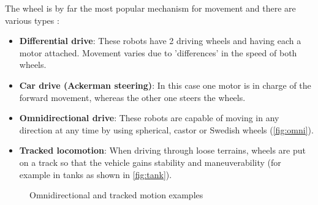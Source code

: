The wheel is by far the most popular mechanism for movement and there are various types :

\begin{itemize}
  \item \textbf{Differential drive}: These robots have 2 driving wheels and having each a motor attached. Movement varies due to 'differences' in the speed of both wheels.

  \item \textbf{Car drive (Ackerman steering)}: In this case one motor is in charge of the forward movement, whereas the other one steers the wheels.

  \item \textbf{Omnidirectional drive}: These robots are capable of moving in any direction at any time by using spherical, castor or Swedish wheels (\autoref{fig:omni}).

  \item \textbf{Tracked locomotion}: When driving through loose terrains, wheels are put on a track so that the vehicle gains stability and maneuverability (for example in tanks as shown in \autoref{fig:tank}).

\end{itemize}

\begin{figure}[htb]
  \centering
   \quad
  \caption{Omnidirectional and tracked motion examples}
  \label{fig:omnitank}
\end{figure}  

